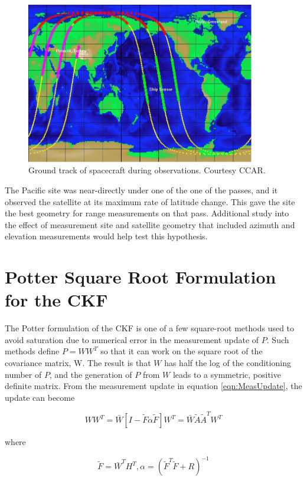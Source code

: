 \documentclass[]{aiaa-tc}%
\begin{document}
	\begin{figure}[H]
		\centering
		\includegraphics[width = 10cm]{CoveragePlot.jpg}
		\caption{Ground track of spacecraft during observations. Courtesy CCAR. }
		\label{fig:GroundTrack}
	\end{figure}	

	The Pacific site was near-directly under one of the one of the passes, and it observed the satellite at its maximum rate of latitude change. This gave the site the best geometry for range measurements on that pass.  Additional study into the effect of measurement site and satellite geometry that included azimuth and elevation measurements would help test this hypothesis. 

	\section{Potter Square Root Formulation for the CKF}

	The Potter formulation of the CKF is one of a few square-root methods used to avoid saturation due to numerical error in the measurement update of $P$. Such methods define $P=WW^T$ so that it can work on the square root of the covariance matrix, W. The result is that $W$ has half the log of the conditioning number of $P$, and the generation of $P$ from $W$ leads to a symmetric, positive definite matrix. From the measurement update in equation \ref{eqn:MeasUpdate}, the update can become

	\begin{equation}
	WW^T=\bar{W}[I-\tilde{F}\alpha\tilde{F}]W^T=\bar{W}\tilde{A}\tilde{A}^TW^T
	\end{equation}

	\noindent where

	\begin{equation}
	\tilde{F}=\bar{W}^TH^T,\alpha=(\tilde{F}^T\tilde{F}+R)^{-1}
	\end{equation}
\end{document}

